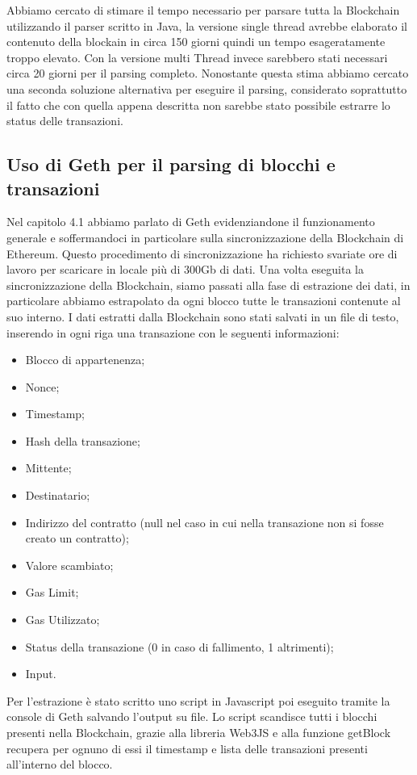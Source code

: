 \documentclass[12pt]{report}
\begin{document}
Abbiamo cercato di stimare il tempo necessario per parsare tutta la Blockchain utilizzando il parser scritto in Java, la versione single thread avrebbe elaborato il contenuto della blockain in circa 150 giorni quindi un tempo esageratamente troppo elevato.
Con la versione multi Thread invece sarebbero stati necessari circa 20 giorni per il parsing completo.
Nonostante questa stima abbiamo cercato una seconda soluzione alternativa per eseguire il parsing, considerato soprattutto il fatto che con quella appena descritta non sarebbe stato possibile estrarre lo status delle transazioni.

\subsection {Uso di Geth per il parsing di blocchi e transazioni}

Nel capitolo 4.1 abbiamo parlato di Geth evidenziandone il funzionamento generale e soffermandoci in particolare sulla sincronizzazione della Blockchain di Ethereum. Questo procedimento di sincronizzazione ha richiesto svariate ore di lavoro per scaricare in locale più di 300Gb di dati.
Una volta eseguita la sincronizzazione della Blockchain, siamo passati alla fase di estrazione dei dati, in particolare abbiamo estrapolato da ogni blocco tutte le transazioni contenute al suo interno.
I dati estratti dalla Blockchain sono stati salvati in un file di testo, inserendo in ogni riga una transazione con le seguenti informazioni:
\begin{itemize}
\item Blocco di appartenenza;
\item Nonce;
\item Timestamp;
\item Hash della transazione;
\item Mittente;
\item Destinatario;
\item Indirizzo del contratto (null nel caso in cui nella transazione non si fosse creato un contratto);
\item Valore scambiato;
\item Gas Limit;
\item Gas Utilizzato;
\item Status della transazione (0 in caso di fallimento, 1 altrimenti);
\item Input.
\end{itemize}

Per l'estrazione è stato scritto uno script in Javascript poi eseguito tramite la console di Geth salvando l'output su file.
Lo script scandisce tutti i blocchi presenti nella Blockchain, grazie alla libreria Web3JS e alla funzione getBlock recupera per ognuno di essi il timestamp e lista delle transazioni presenti all'interno del blocco.
\end{document}
